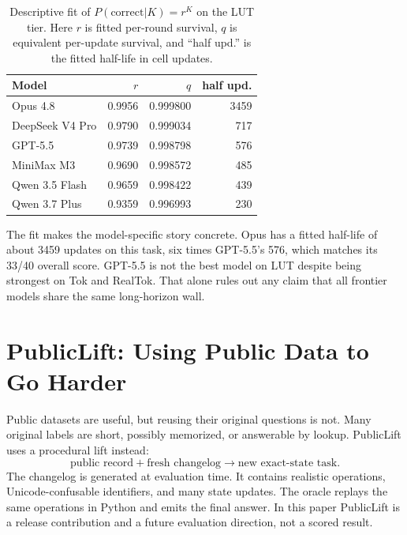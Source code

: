 \documentclass[10pt,twocolumn]{article}
\begin{document}
\begin{table}[t]
\centering
\scriptsize
\setlength{\tabcolsep}{3pt}
\begin{tabular}{lrrr}
\toprule
Model & $r$ & $q$ & half upd. \\
\midrule
Opus 4.8 & 0.9956 & 0.999800 & 3459 \\
DeepSeek V4 Pro & 0.9790 & 0.999034 & 717 \\
GPT-5.5 & 0.9739 & 0.998798 & 576 \\
MiniMax M3 & 0.9690 & 0.998572 & 485 \\
Qwen 3.5 Flash & 0.9659 & 0.998422 & 439 \\
Qwen 3.7 Plus & 0.9359 & 0.996993 & 230 \\
\bottomrule
\end{tabular}
\caption{Descriptive fit of $P(\mathrm{correct}|K)=r^K$ on the LUT tier. Here $r$ is fitted per-round survival, $q$ is equivalent per-update survival, and ``half upd.'' is the fitted half-life in cell updates.}
\label{tab:fit}
\end{table}

The fit makes the model-specific story concrete. Opus has a fitted half-life of about 3459 updates on this task, six times GPT-5.5's 576, which matches its 33/40 overall score. GPT-5.5 is not the best model on LUT despite being strongest on Tok and RealTok. That alone rules out any claim that all frontier models share the same long-horizon wall.

\section{PublicLift: Using Public Data to Go Harder}
Public datasets are useful, but reusing their original questions is not. Many original labels are short, possibly memorized, or answerable by lookup. PublicLift uses a procedural lift instead:
\[
    \text{public record} + \text{fresh changelog} \rightarrow \text{new exact-state task}.
\]
The changelog is generated at evaluation time. It contains realistic operations, Unicode-confusable identifiers, and many state updates. The oracle replays the same operations in Python and emits the final answer. In this paper PublicLift is a release contribution and a future evaluation direction, not a scored result.
\end{document}
